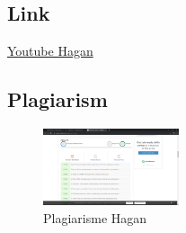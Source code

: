 \subsection{Link}
\href{https://www.youtube.com/watch?v=oCACYiDI29s}{Youtube Hagan}
\subsection{Plagiarism}

\begin{figure}[H]
	\includegraphics[width=4cm]{figures/1174040/1174040_plagiat_1.png}
	\centering
	\caption{Plagiarisme Hagan}
\end{figure}


